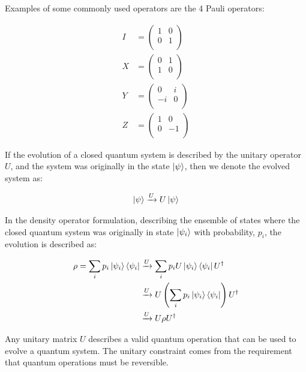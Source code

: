 Examples of some commonly used operators are the 4 Pauli operators:

\begin{align}
    I &= \begin{pmatrix}
        1 & 0 \\ 
        0 & 1 \\ 
    \end{pmatrix} \\ 
    X &= \begin{pmatrix}
        0 & 1 \\ 
        1 & 0 \\ 
    \end{pmatrix} \\ 
    Y &= \begin{pmatrix}
        0 & i \\ 
        -i & 0 \\ 
    \end{pmatrix} \\ 
    Z &= \begin{pmatrix}
        1 & 0 \\ 
        0 & -1 \\ 
    \end{pmatrix}
\end{align}

If the evolution of a closed quantum system is described by the unitary operator $U$, and the system was originally in the state $\ket{\psi}$, then we denote the evolved system as:

\begin{align}
    \ket{\psi} \xrightarrow{U} U \ket{\psi}
\end{align}

In the density operator formulation, describing the ensemble of states where the closed quantum system was originally in state $\ket{\psi_i}$ with probability, $p_i$, the evolution is described as:

\begin{align}
    \rho = \sum_i p_i \ket{\psi_i}\bra{\psi_i} &\xrightarrow{U} \sum_i p_i U\ket{\psi_i}\bra{\psi_i}U^{\dagger} \\
    &\xrightarrow{U} U \left(\sum_i p_i \ket{\psi_i}\bra{\psi_i} \right)U^{\dagger} \\
    &\xrightarrow{U} U \rho U^{\dagger}
\end{align}

Any unitary matrix $U$ describes a valid quantum operation that can be used to evolve a quantum system. The unitary constraint comes from the requirement that quantum operations must be reversible.

